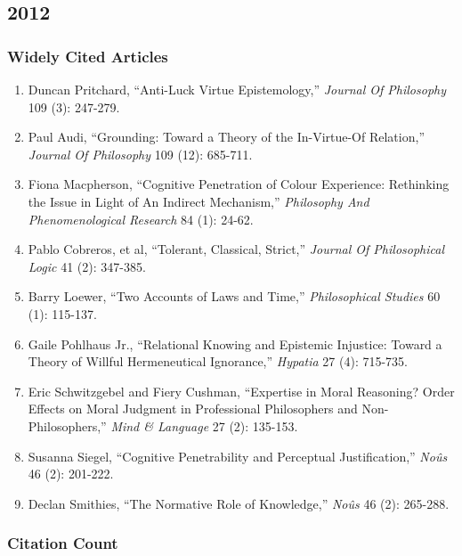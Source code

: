 \documentclass[
  10pt,
  letterpaper,
  DIV=11,
  numbers=noendperiod,
  twoside]{scrartcl}
\providecommand{\tightlist}{%
  \setlength{\itemsep}{0pt}\setlength{\parskip}{0pt}}\usepackage{longtable,booktabs,array}
\begin{document}
\newpage

\subsection{2012}\label{sec-s2012}

\subsubsection*{Widely Cited Articles}\label{widely-cited-articles-36}

\begin{enumerate}
\def\labelenumi{\arabic{enumi}.}
\tightlist
\item
  Duncan Pritchard, ``Anti-Luck Virtue Epistemology,'' \emph{Journal Of
  Philosophy} 109 (3): 247-279.
\item
  Paul Audi, ``Grounding: Toward a Theory of the In-Virtue-Of
  Relation,'' \emph{Journal Of Philosophy} 109 (12): 685-711.
\item
  Fiona Macpherson, ``Cognitive Penetration of Colour Experience:
  Rethinking the Issue in Light of An Indirect Mechanism,''
  \emph{Philosophy And Phenomenological Research} 84 (1): 24-62.
\item
  Pablo Cobreros, et al, ``Tolerant, Classical, Strict,'' \emph{Journal
  Of Philosophical Logic} 41 (2): 347-385.
\item
  Barry Loewer, ``Two Accounts of Laws and Time,'' \emph{Philosophical
  Studies} 60 (1): 115-137.
\item
  Gaile Pohlhaus Jr., ``Relational Knowing and Epistemic Injustice:
  Toward a Theory of Willful Hermeneutical Ignorance,'' \emph{Hypatia}
  27 (4): 715-735.
\item
  Eric Schwitzgebel and Fiery Cushman, ``Expertise in Moral Reasoning?
  Order Effects on Moral Judgment in Professional Philosophers and
  Non-Philosophers,'' \emph{Mind \& Language} 27 (2): 135-153.
\item
  Susanna Siegel, ``Cognitive Penetrability and Perceptual
  Justification,'' \emph{Noûs} 46 (2): 201-222.
\item
  Declan Smithies, ``The Normative Role of Knowledge,'' \emph{Noûs} 46
  (2): 265-288.
\end{enumerate}

\subsubsection*{Citation Count}\label{sec-count-2012}
\end{document}
